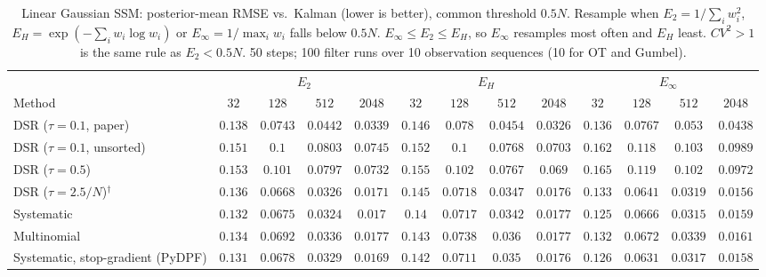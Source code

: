 \begin{table}[ht]
\centering
\small
\caption{Linear Gaussian SSM: posterior-mean RMSE vs.\ Kalman (lower is better), common threshold $0.5N$. Resample when $E_2=1/\sum_iw_i^2$, $E_H=\exp(-\sum_iw_i\log w_i)$ or $E_\infty=1/\max_iw_i$ falls below $0.5N$. $E_\infty\le E_2\le E_H$, so $E_\infty$ resamples most often and $E_H$ least. $CV^2>1$ is the same rule as $E_2<0.5N$. 50 steps; 100 filter runs over 10 observation sequences (10 for OT and Gumbel).}
\label{tab:trigger-fixed-linear-posterior_mean_rmse}
\begin{adjustbox}{max width=\linewidth}
\begin{tabular}{lcccc|cccc|cccc}
\toprule
 & \multicolumn{4}{c}{$E_2$} & \multicolumn{4}{c}{$E_H$} & \multicolumn{4}{c}{$E_\infty$} \\
\cmidrule(lr){2-5} \cmidrule(lr){6-9} \cmidrule(lr){10-13}
Method & $32$ & $128$ & $512$ & $2048$ & $32$ & $128$ & $512$ & $2048$ & $32$ & $128$ & $512$ & $2048$ \\
\midrule
DSR ($\tau{=}0.1$, paper) & $0.138$ & $\mathbf{0.0743}$ & $\mathbf{0.0442}$ & $0.0339$ & $0.146$ & $0.078$ & $0.0454$ & $\mathbf{0.0326}$ & $\mathbf{0.136}$ & $0.0767$ & $0.053$ & $0.0438$ \\
DSR ($\tau{=}0.1$, unsorted) & $\mathbf{0.151}$ & $0.1$ & $0.0803$ & $0.0745$ & $0.152$ & $\mathbf{0.1}$ & $\mathbf{0.0768}$ & $\mathbf{0.0703}$ & $0.162$ & $0.118$ & $0.103$ & $0.0989$ \\
DSR ($\tau{=}0.5$) & $\mathbf{0.153}$ & $\mathbf{0.101}$ & $0.0797$ & $0.0732$ & $0.155$ & $0.102$ & $\mathbf{0.0767}$ & $\mathbf{0.069}$ & $0.165$ & $0.119$ & $0.102$ & $0.0972$ \\
DSR ($\tau{=}2.5/N$)$^\dagger$ & $0.136$ & $0.0668$ & $0.0326$ & $0.0171$ & $0.145$ & $0.0718$ & $0.0347$ & $0.0176$ & $\mathbf{0.133}$ & $\mathbf{0.0641}$ & $\mathbf{0.0319}$ & $\mathbf{0.0156}$ \\
\midrule
Systematic & $0.132$ & $0.0675$ & $0.0324$ & $0.017$ & $0.14$ & $0.0717$ & $0.0342$ & $0.0177$ & $\mathbf{0.125}$ & $\mathbf{0.0666}$ & $\mathbf{0.0315}$ & $\mathbf{0.0159}$ \\
Multinomial & $0.134$ & $0.0692$ & $\mathbf{0.0336}$ & $0.0177$ & $0.143$ & $0.0738$ & $0.036$ & $0.0177$ & $\mathbf{0.132}$ & $\mathbf{0.0672}$ & $0.0339$ & $\mathbf{0.0161}$ \\
Systematic, stop-gradient (PyDPF) & $0.131$ & $0.0678$ & $0.0329$ & $0.0169$ & $0.142$ & $0.0711$ & $0.035$ & $0.0176$ & $\mathbf{0.126}$ & $\mathbf{0.0631}$ & $\mathbf{0.0317}$ & $\mathbf{0.0158}$ \\

\end{tabular}
\end{adjustbox}
\end{table}
